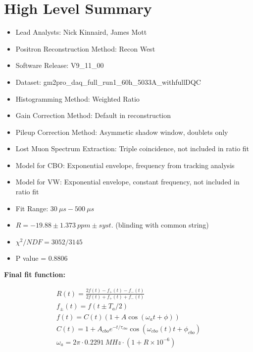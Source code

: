 \chapter*{High Level Summary}

\begin{itemize}
	\item{Lead Analysts: Nick Kinnaird, James Mott}
	\item{Positron Reconstruction Method: Recon West}
	\item{Software Release: V9\_11\_00}
	\item{Dataset: gm2pro\_daq\_full\_run1\_60h\_5033A\_withfullDQC}
	\item{Histogramming Method: Weighted Ratio}
	\item{Gain Correction Method: Default in reconstruction}
	\item{Pileup Correction Method: Asymmetic shadow window, doublets only}
	\item{Lost Muon Spectrum Extraction: Triple coincidence, not included in ratio fit}
	\item{Model for CBO: Exponential envelope, frequency from tracking analysis}
	\item{Model for VW: Exponential envelope, constant frequency, not included in ratio fit}
	\item{Fit Range: $\SI{30}{\mu s} - \SI{500}{\mu s}$}
	\item{$R = -19.88 \pm \SI{1.373}{ppm} \pm syst.$ (blinding with common string)}
	\item{$\chi^{2}/NDF = 3052/3145$}
	\item{P value = 0.8806}
\end{itemize}

\textbf{Final fit function:}

\begin{gather*}
		R(t) = \frac{2f(t) - f_{+}(t) - f_{-}(t)}{2f(t) + f_{+}(t) + f_{-}(t)} \\[10pt]
		f_{\pm}(t) = f(t \pm T_{a}/2) \\[10pt]
		f(t) = C(t) (1 + A \cos(\omega_{a}t + \phi)) \\[10pt]
		C(t) = 1 + A_{cbo} e^{-t/\tau_{cbo}} \cos(\omega_{cbo}(t)t + \phi_{cbo}) \\[10pt]
		\omega_{a} = 2 \pi \cdot \SI{0.2291}{MHz} \cdot (1 + R \times 10^{-6})
\end{gather*}
